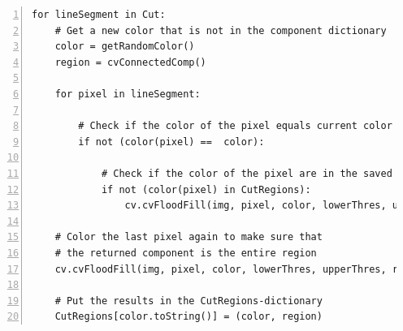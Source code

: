 {\begin{lstlisting}[caption={Original pseudokode til udtrækning af
    regioner. Denne kan returnere den samme region flere
    gange.},captionpos=b,label={pseudo_udtraek_org},numbers=left,
    frame=tb, breaklines=false, float=h]
for lineSegment in Cut:
    # Get a new color that is not in the component dictionary
    color = getRandomColor()
    region = cvConnectedComp()

    for pixel in lineSegment:

        # Check if the color of the pixel equals current color
        if not (color(pixel) ==  color):

            # Check if the color of the pixel are in the saved regions
            if not (color(pixel) in CutRegions):
                cv.cvFloodFill(img, pixel, color, lowerThres, upperThres, region)

    # Color the last pixel again to make sure that
    # the returned component is the entire region
    cv.cvFloodFill(img, pixel, color, lowerThres, upperThres, region)

    # Put the results in the CutRegions-dictionary
    CutRegions[color.toString()] = (color, region)
\end{lstlisting}

}
